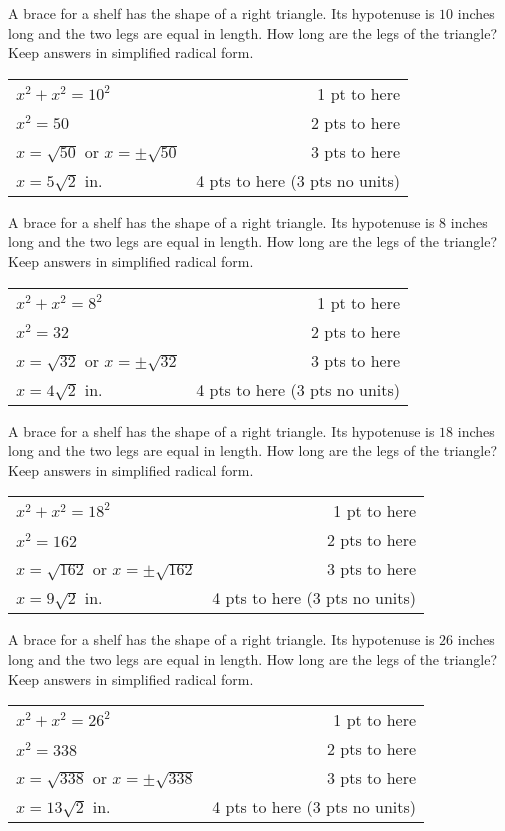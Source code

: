 {
	A brace for a shelf has the shape of a right triangle. Its hypotenuse is $10$ inches long and the two legs are equal in length. How long are the legs of the triangle? Keep answers in simplified radical form.
}
{
	\begin{tabular}{l r}
	$x^2+x^2 = 10^2$ & 1 pt to here\\
	$x^2=50$ & 2 pts to here\\
	$x=\sqrt{50}$ or $x=\pm \sqrt{50}$ & 3 pts to here\\
	$x=5\sqrt{2}$ in. & 4 pts to here (3 pts no units)
	\end{tabular}
}

{
	A brace for a shelf has the shape of a right triangle. Its hypotenuse is $8$ inches long and the two legs are equal in length. How long are the legs of the triangle? Keep answers in simplified radical form.
}
{
	\begin{tabular}{l r}
	$x^2+x^2 = 8^2$ & 1 pt to here\\
	$x^2=32$ & 2 pts to here\\
	$x=\sqrt{32}$ or $x=\pm \sqrt{32}$ & 3 pts to here\\
	$x=4\sqrt{2}$ in. & 4 pts to here (3 pts no units)
	\end{tabular}
}

{
	A brace for a shelf has the shape of a right triangle. Its hypotenuse is $18$ inches long and the two legs are equal in length. How long are the legs of the triangle? Keep answers in simplified radical form.
}
{
	\begin{tabular}{l r}
	$x^2+x^2 = 18^2$ & 1 pt to here\\
	$x^2=162$ & 2 pts to here\\
	$x=\sqrt{162}$ or $x=\pm \sqrt{162}$ & 3 pts to here\\
	$x=9\sqrt{2}$ in. & 4 pts to here (3 pts no units)
	\end{tabular}
}

{
	A brace for a shelf has the shape of a right triangle. Its hypotenuse is $26$ inches long and the two legs are equal in length. How long are the legs of the triangle? Keep answers in simplified radical form.
}
{
	\begin{tabular}{l r}
	$x^2+x^2 = 26^2$ & 1 pt to here\\
	$x^2=338$ & 2 pts to here\\
	$x=\sqrt{338}$ or $x=\pm \sqrt{338}$ & 3 pts to here\\
	$x=13\sqrt{2}$ in. & 4 pts to here (3 pts no units)
	\end{tabular}
}
